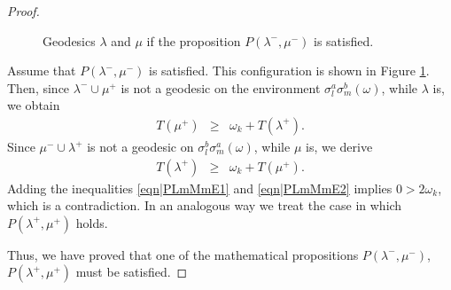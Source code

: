 \documentclass[reqno]{amsart}
\begin{document}
\begin{proof}
 \begin{figure}[t]
 \centering
{}
\caption{Geodesics $\lambda$ and $\mu$ if the proposition $P(\lambda^-,\mu^-)$ is satisfied.}
\label{fig|PLmMm}
\end{figure}

Assume that $P(\lambda^-,\mu^-)$ is satisfied. This configuration is shown in Figure \ref{fig|PLmMm}.
Then, since $\lambda^-\cup \mu^+$ is not a geodesic on the environment $\sigma_l^a\sigma_m^b(\omega)$, while $\lambda$ is, we obtain 
\begin{eqnarray}
T(\mu^+)&\geq &
\omega_k+T(\lambda^+). \label{eqn|PLmMmE1}
\end{eqnarray}
Since $\mu^-\cup \lambda^+$ is not a geodesic on  $\sigma_l^b\sigma_m^a(\omega)$, while $\mu$ is, we derive
\begin{eqnarray}
T(\lambda^+)&\geq&
\omega_k+T(\mu^+). \label{eqn|PLmMmE2}
\end{eqnarray}
Adding the inequalities \eqref{eqn|PLmMmE1} and  \eqref{eqn|PLmMmE2} implies 
$0>2\omega_k$, which is a contradiction.
In an analogous way we treat the case in which $P(\lambda^+,\mu^+)$ holds. 

Thus, we have proved that one of the mathematical propositions 
$P(\lambda^-,\mu^-)$, 
$P(\lambda^+,\mu^+)$ must be satisfied.
\end{proof}
\end{document}
